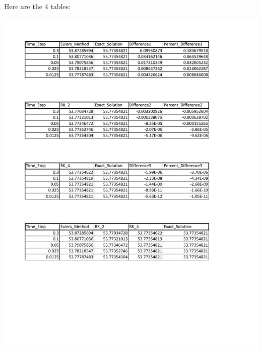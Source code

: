 \documentclass[12pt]{article}
\begin{document}
Here are the 4 tables:

\includegraphics{Tables}
\end{document}
